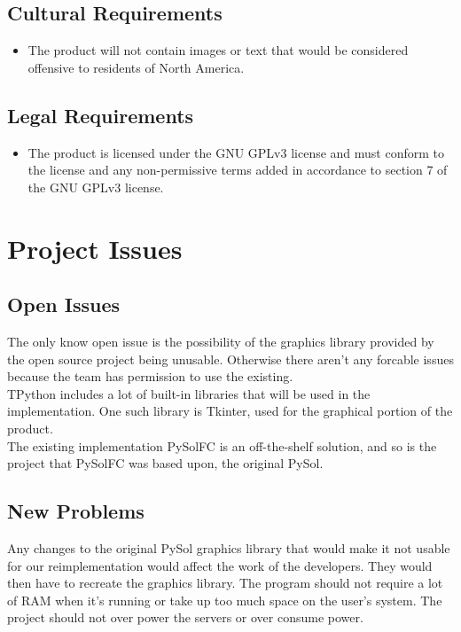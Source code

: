 \documentclass{article}
\begin{document}
		\subsection{Cultural Requirements}
		\begin{itemize}
			\itemsep0em
			\item The product will not contain images or text that would be 
			considered offensive to residents of North America.
		\end{itemize}
		\subsection{Legal Requirements}
		\begin{itemize}
			\itemsep0em
			\item The product is licensed under the GNU GPLv3 license and must 
			conform to the license and any non-permissive terms added in 
			accordance to section 7 of the GNU GPLv3 license.
		\end{itemize}
		
	\section{Project Issues}
		\subsection{Open Issues}
		\indent The only know open issue is the possibility of the graphics library provided by the open source project being unusable. Otherwise there aren't any forcable issues because the team has permission to use the existing.\\
		\indent TPython includes a lot of built-in libraries that will be used in the implementation. One such library is Tkinter, used for the graphical portion of the product.\\
		\indent The existing implementation PySolFC is an off-the-shelf solution, and so is the project that PySolFC was based upon, the original PySol.\\
		\subsection{New Problems}
		\indent Any changes to the original PySol graphics library that would make it not usable for our reimplementation would affect the work of the developers. They would then have to recreate the graphics library. The program should not require a lot of RAM when it’s running or take up too much space on the user’s system. The project should not over power the servers or over consume power.\\
\end{document}
